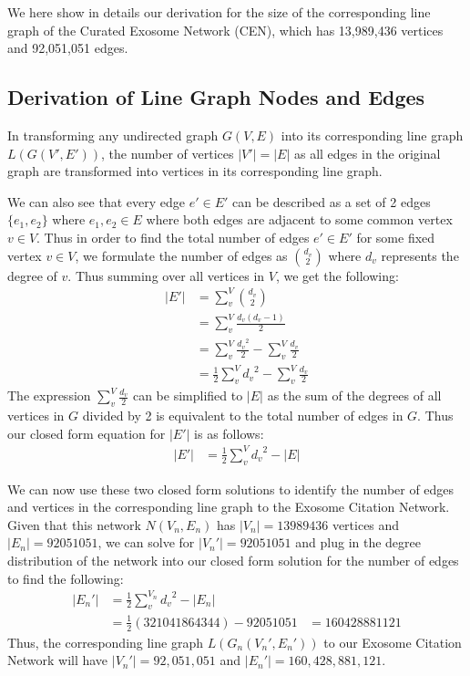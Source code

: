 \documentclass[12pt, oneside]{article}   	%
\begin{document}
We here show in details our derivation for the size of the corresponding line graph of the Curated Exosome Network (CEN), which has 
13,989,436 vertices and 92,051,051 edges.

\subsection{Derivation of Line Graph Nodes and Edges}

In transforming any undirected graph $G(V, E)$ into its corresponding line graph $L(G(V', E'))$, the number of vertices $|V'| = |E|$ as all edges in the original graph are transformed into vertices in its corresponding line graph.

We can also see that every edge $e' \in E'$ can be described as a set of 2 edges $\{e_1, e_2\}$ where $e_1,  e_2 \in E$ where both edges are adjacent to some common vertex $v \in V$.  
Thus in order to find the total number of edges $e' \in E'$ for some fixed vertex $v \in V$, we formulate the number of edges as $d_v \choose 2$ where $d_v$ represents the degree of $v$. Thus summing over all vertices in $V$, we get the following:
\begin{equation}
    \begin{aligned}
    |E'| &= \sum^{V}_{v} {d_v \choose 2}\\
    &= \sum^{V}_{v} \frac{d_v(d_v - 1)}{2}\\
    &= \sum^{V}_{v} \frac{{d_v}^2}{2} - \sum^{V}_{v} \frac{d_v}{2}\\
    &= \frac{1}{2}\sum^{V}_{v} {d_v}^2 - \sum^{V}_{v} \frac{d_v}{2}
    \end{aligned}
\end{equation}
The expression $\sum^{V}_{v} \frac{d_v}{2}$ can be simplified to $|E|$ as the sum of the degrees of all vertices in $G$ divided by 2 is equivalent to the total number of edges in $G$. Thus our closed form equation for $|E'|$ is as follows:
\begin{equation}
    \begin{aligned}
    |E'| &= \frac{1}{2}\sum^{V}_{v} {d_v}^2 - |E|
    \end{aligned}
\end{equation}


We can now use these two closed form solutions to identify the number of edges and vertices in the corresponding line graph to the Exosome Citation Network. Given that this network $N(V_n, E_n)$ has $|V_n| = 13989436$ vertices and $|E_n| = 92051051$, we can solve for $|V_n'| = 92051051$ and plug in the degree distribution of the network into our closed form solution for the number of edges to find the following:
\begin{equation}
    \begin{aligned}
    |E_n'| &= \frac{1}{2}\sum^{V_n}_{v} {d_v}^2 - |E_n|\\
    &= \frac{1}{2}(321041864344) - 92051051
    &= 160428881121
    \end{aligned}
\end{equation}
Thus, the corresponding line graph $L(G_n(V_n', E_n'))$ to our Exosome Citation Network will have $|V_n'| = 92,051,051$ and $|E_n'| = 160,428,881,121$. 





\end{document}
